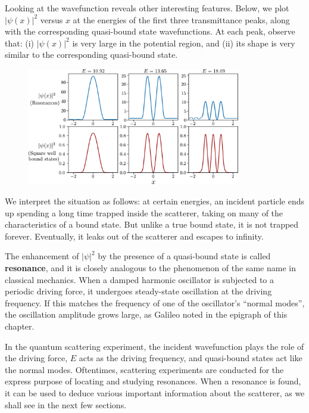 \documentclass[pra,12pt]{revtex4-2}
\begin{document}
Looking at the wavefunction reveals other interesting features.
Below, we plot $|\psi(x)|^2$ versus $x$ at the energies of the first
three transmittance peaks, along with the corresponding quasi-bound
state wavefunctions.  At each peak, observe that: (i) $|\psi(x)|^2$ is
very large in the potential region, and (ii) its shape is very similar
to the corresponding quasi-bound state.

\begin{figure}[h]
  \centering\includegraphics[width=0.83\textwidth]{resonancewavefunctions}
\end{figure}

\noindent
We interpret the situation as follows: at certain energies, an
incident particle ends up spending a long time trapped inside the
scatterer, taking on many of the characteristics of a bound state.
But unlike a true bound state, it is not trapped forever.  Eventually,
it leaks out of the scatterer and escapes to infinity.

The enhancement of $|\psi|^2$ by the presence of a quasi-bound state
is called \textbf{resonance}, and it is closely analogous to the
phenomenon of the same name in classical mechanics.  When a damped
harmonic oscillator is subjected to a periodic driving force, it
undergoes steady-state oscillation at the driving frequency.  If this
matches the frequency of one of the oscillator's ``normal modes'', the
oscillation amplitude grows large, as Galileo noted in the epigraph of
this chapter.

In the quantum scattering experiment, the incident wavefunction plays
the role of the driving force, $E$ acts as the driving frequency, and
quasi-bound states act like the normal modes.  Oftentimes, scattering
experiments are conducted for the express purpose of locating and
studying resonances.  When a resonance is found, it can be used to
deduce various important information about the scatterer, as we shall
see in the next few sections.
\end{document}
